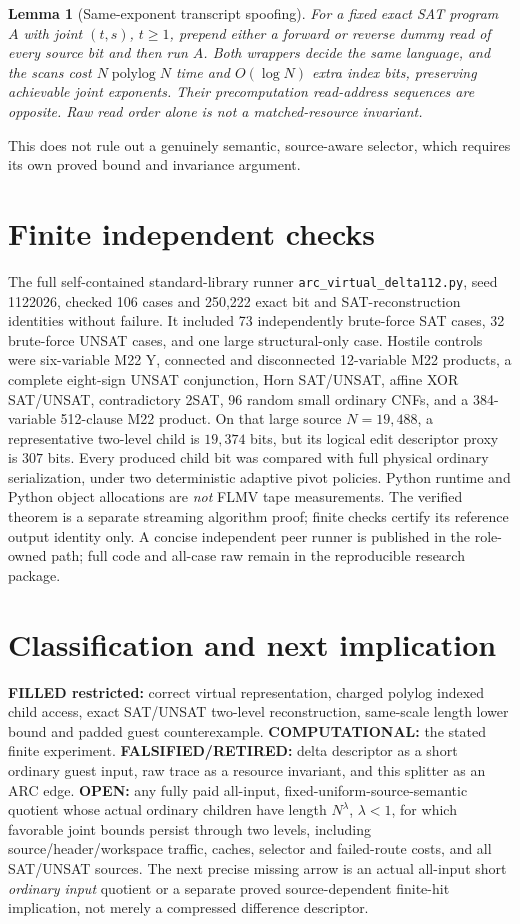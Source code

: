 \documentclass[11pt]{article}
\newtheorem{lemma}[theorem]{Lemma}
\begin{document}
\begin{lemma}[Same-exponent transcript spoofing]
For a fixed exact SAT program $A$ with joint $(t,s)$, $t\ge1$, prepend either a forward or reverse dummy read of every source bit and then run $A$. Both wrappers decide the same language, and the scans cost $N\operatorname{polylog}N$ time and $O(\log N)$ extra index bits, preserving achievable joint exponents. Their precomputation read-address sequences are opposite. Raw read order alone is not a matched-resource invariant.
\end{lemma}
This does not rule out a genuinely semantic, source-aware selector, which requires its own proved bound and invariance argument.

\section{Finite independent checks}
The full self-contained standard-library runner \texttt{arc\_virtual\_delta112.py}, seed 1122026, checked 106 cases and 250,222 exact bit and SAT-reconstruction identities without failure. It included 73 independently brute-force SAT cases, 32 brute-force UNSAT cases, and one large structural-only case. Hostile controls were six-variable M22 Y, connected and disconnected 12-variable M22 products, a complete eight-sign UNSAT conjunction, Horn SAT/UNSAT, affine XOR SAT/UNSAT, contradictory 2SAT, 96 random small ordinary CNFs, and a 384-variable 512-clause M22 product. On that large source $N=19{,}488$, a representative two-level child is $19{,}374$ bits, but its logical edit descriptor proxy is $307$ bits. Every produced child bit was compared with full physical ordinary serialization, under two deterministic adaptive pivot policies. Python runtime and Python object allocations are \emph{not} FLMV tape measurements. The verified theorem is a separate streaming algorithm proof; finite checks certify its reference output identity only. A concise independent peer runner is published in the role-owned path; full code and all-case raw remain in the reproducible research package.

\section{Classification and next implication}
\textbf{FILLED restricted:} correct virtual representation, charged polylog indexed child access, exact SAT/UNSAT two-level reconstruction, same-scale length lower bound and padded guest counterexample. \textbf{COMPUTATIONAL:} the stated finite experiment. \textbf{FALSIFIED/RETIRED:} delta descriptor as a short ordinary guest input, raw trace as a resource invariant, and this splitter as an ARC edge. \textbf{OPEN:} any fully paid all-input, fixed-uniform-source-semantic quotient whose actual ordinary children have length $N^\lambda$, $\lambda<1$, for which favorable joint bounds persist through two levels, including source/header/workspace traffic, caches, selector and failed-route costs, and all SAT/UNSAT sources.
The next precise missing arrow is an actual all-input short \emph{ordinary input} quotient or a separate proved source-dependent finite-hit implication, not merely a compressed difference descriptor.
\end{document}
